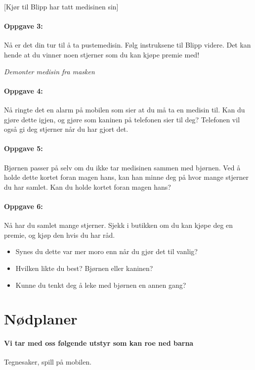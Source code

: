 [Kj\o r til Blipp har tatt medisinen sin]

\paragraph{Oppgave 3:}
N\r{a}  er det din tur til \r{a}  ta pustemedisin. F\o lg instruksene til Blipp videre. Det kan hende at du vinner noen stjerner som du kan kj\o pe premie med!

\emph{Demonter medisin fra masken}


\paragraph{Oppgave 4:}
N\r{a}  ringte det en alarm p\r{a}  mobilen som sier at du m\r{a}  ta en medisin til. Kan du gj\o re dette igjen, og gj\o re som kaninen p\r{a}  telefonen sier til deg? Telefonen vil ogs\r{a}  gi deg stjerner n\r{a}r du har gjort det. 

\paragraph{Oppgave 5:} Bj\o rnen passer p\r{a} selv om du ikke tar medisinen sammen med bj\o rnen. Ved \r{a} holde dette kortet foran magen hans, kan han minne deg p\r{a} hvor mange stjerner du har samlet. Kan du holde kortet foran magen hans?

\paragraph{Oppgave 6:}
N\r{a}  har du samlet mange stjerner. Sjekk i butikken om du kan kj\o pe deg en premie, og kj\o p den hvis du har r\r{a}d.  


\begin{itemize}
  \item Synes du dette var mer moro enn n\r{a}r du gj\o r det til vanlig?
  \item Hvilken likte du best? Bj\o rnen eller kaninen?
  \item Kunne du tenkt deg \r{a}  leke med bj\o rnen en annen gang? 
\end{itemize}

\section{N\o dplaner}
\paragraph{Vi tar med oss f\o lgende utstyr som kan roe ned barna}
Tegnesaker, spill p\r{a}  mobilen. 

